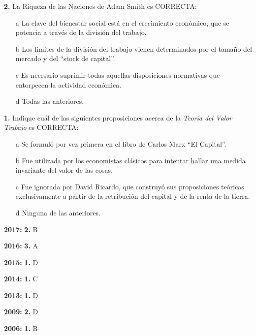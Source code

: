 \documentclass{nuevotema}
\begin{document}
\textbf{2.} La Riqueza de las Naciones de Adam Smith es CORRECTA:
\begin{itemize}
	\item[a] La clave del bienestar social está en el crecimiento económico, que se potencia a través de la división del trabajo.
	\item[b] Los límites de la división del trabajo vienen determinados por el tamaño del mercado y del ``stock de capital''. 
	\item[c] Es necesario suprimir todas aquellas disposiciones normativas que entorpecen la actividad económica.
	\item[d] Todas las anteriores.
\end{itemize}

\textbf{1.} Indique cuál de las siguientes proposiciones acerca de la \textit{Teoría del Valor Trabajo} es CORRECTA:

\begin{itemize}
	\item[a] Se formuló por vez primera en el libro de Carlos Marx ``El Capital''.
	\item[b] Fue utilizada por los economistas clásicos para intentar hallar una medida invariante del valor de las cosas.
	\item[c] Fue ignorada por David Ricardo, que construyó sus proposiciones teóricas exclusivamente a partir de la retribución del capital y de la renta de la tierra.
	\item[d] Ninguna de las anteriores.
\end{itemize}

\notas

\textbf{2017:} \textbf{2.} B

\textbf{2016:} \textbf{3.} A

\textbf{2015:} \textbf{1.} D

\textbf{2014:} \textbf{1.} C

\textbf{2013:} \textbf{1.} D

\textbf{2009:} \textbf{2.} D

\textbf{2006:} \textbf{1.} B

\bibliografia
\end{document}
